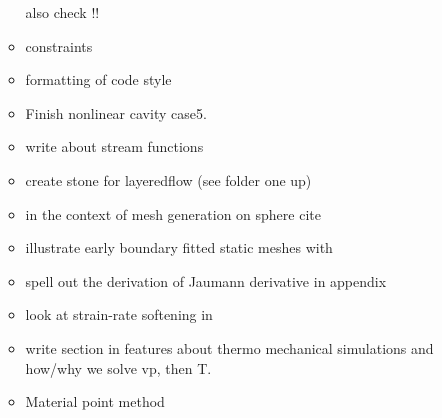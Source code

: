 \begin{itemize}
\begin{itemize}
also check \cite{ensa82} !!
\item constraints \cite{absh79}
\item formatting of code style
\item Finish nonlinear cavity case5.
\item write about stream functions 
\item create stone for layeredflow (see folder one up)
\item in the context of mesh generation on sphere cite \cite{moma19}
\item illustrate early boundary fitted static meshes with \cite{thar85}
\item \cite{bepo10} spell out the derivation of Jaumann derivative in appendix
\item look at strain-rate softening in \cite{belz02}
\item write section in features about thermo mechanical simulations and how/why we solve vp, then T.
\item Material point method \cite{sucs94,susc96,susp07}
\end{itemize}



\end{itemize}
